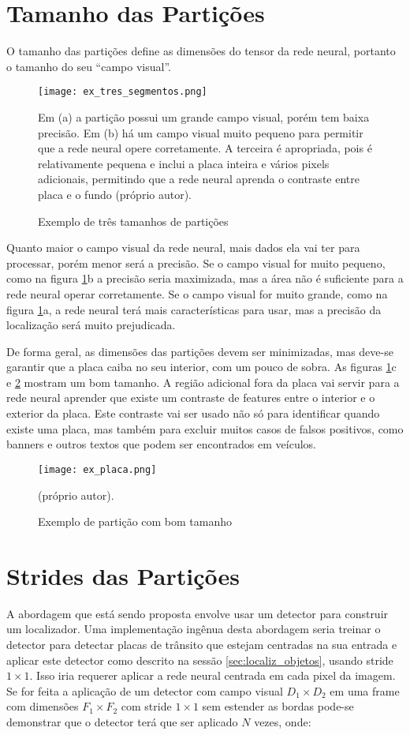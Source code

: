 \section{Tamanho das Partições}
O tamanho das partições define as dimensões do tensor da rede neural, portanto
o tamanho do seu “campo visual”.


\begin{figure}[!htb]
	\centering
	\texttt{[image: ex\_tres\_segmentos.png]}
	\caption{Exemplo de três tamanhos de partições}
	\label{fig:ex_tres_segmentos}
	Em (a) a partição possui um grande campo visual, porém tem baixa precisão.
	Em (b) há um campo visual muito pequeno para permitir que a rede neural
	opere corretamente. A terceira é apropriada, pois é relativamente pequena e
	inclui a placa inteira e vários pixels adicionais, permitindo que a rede
	neural aprenda o contraste entre placa e o fundo (próprio autor).
\end{figure}

Quanto maior o campo visual da rede neural, mais dados ela vai ter para
processar, porém menor será a precisão. Se o campo visual for muito pequeno,
como na figura \ref{fig:ex_tres_segmentos}b a precisão seria maximizada,
mas a área não é suficiente para a rede neural operar corretamente. Se
o campo visual for muito grande, como na figura \ref{fig:ex_tres_segmentos}a,
a rede neural terá mais características para usar, mas a precisão da
localização será muito prejudicada.

De forma geral, as dimensões das partições devem ser minimizadas, mas deve-se
garantir que a placa caiba no seu interior, com um pouco de
sobra. As figuras \ref{fig:ex_tres_segmentos}c e \ref{fig:ex_placa} mostram
um bom tamanho. A região adicional fora da placa vai servir para a rede
neural aprender que existe um contraste de features entre o
interior e o exterior da placa. Este contraste vai ser usado não só para
identificar quando existe uma placa, mas também para excluir muitos casos de
falsos positivos, como banners e outros textos que podem ser encontrados em
veículos.

\begin{figure}[!htb]
	\centering
	\texttt{[image: ex\_placa.png]}
	\caption{Exemplo de partição com bom tamanho}
	\label{fig:ex_placa}
	(próprio autor).
\end{figure}

\section{Strides das Partições}
A abordagem que está sendo proposta envolve usar um detector para construir um
localizador. Uma implementação ingênua desta abordagem seria treinar o detector
para detectar placas de trânsito que estejam centradas na sua entrada e aplicar
este detector como descrito na sessão \ref{sec:localiz_objetos}, usando
stride $1 \times 1$.  Isso iria requerer aplicar a rede neural centrada em
cada pixel da imagem. Se for feita a aplicação de um detector com campo
visual $D_1 \times D_2$ em uma frame com dimensões $F_1 \times F_2$ com stride
$1 \times 1$ sem estender as bordas pode-se demonstrar que o detector terá
que ser aplicado $N$ vezes, onde:

